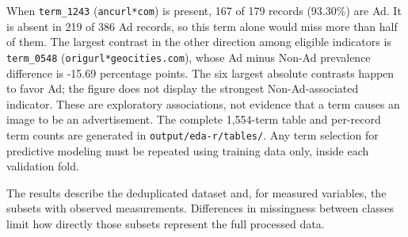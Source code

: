 
When \texttt{term\_1243} (\texttt{ancurl*com}) is present, 167 of 179 records (93.30\%)
are Ad. It is absent in 219 of 386 Ad records, so this term alone
would miss more than half of them. The largest contrast in the other
direction among eligible indicators is \texttt{term\_0548} (\texttt{origurl*geocities.com}), whose Ad minus
Non-Ad prevalence difference is -15.69 percentage points. The six
largest absolute contrasts happen to favor Ad; the figure does not
display the strongest Non-Ad-associated indicator. These are
exploratory associations, not evidence that a term causes an image
to be an advertisement. The complete 1,554-term table and per-record
term counts are generated in \texttt{output/eda-r/tables/}.
Any term selection for predictive modeling must be repeated using
training data only, inside each validation fold.

The results describe the deduplicated dataset and, for measured
variables, the subsets with observed measurements. Differences in
missingness between classes limit how directly those subsets represent
the full processed data.
